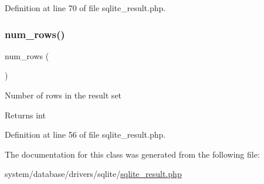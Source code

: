 Definition at line 70 of file sqlite\+\_\+result.\+php.

\mbox{\label{class_c_i___d_b__sqlite__result_a218657c303ee499b97710ab0cd2f5d6e}} 
\subsubsection{\texorpdfstring{num\_rows()}{num\_rows()}}
{\footnotesize\ttfamily num\+\_\+rows (\begin{DoxyParamCaption}{ }\end{DoxyParamCaption})}

Number of rows in the result set

\begin{DoxyReturn}{Returns}
int 
\end{DoxyReturn}


Definition at line 56 of file sqlite\+\_\+result.\+php.



The documentation for this class was generated from the following file\+:\begin{DoxyCompactItemize}
\item 
system/database/drivers/sqlite/\mbox{\hyperlink{sqlite__result_8php}{sqlite\+\_\+result.\+php}}\end{DoxyCompactItemize}
